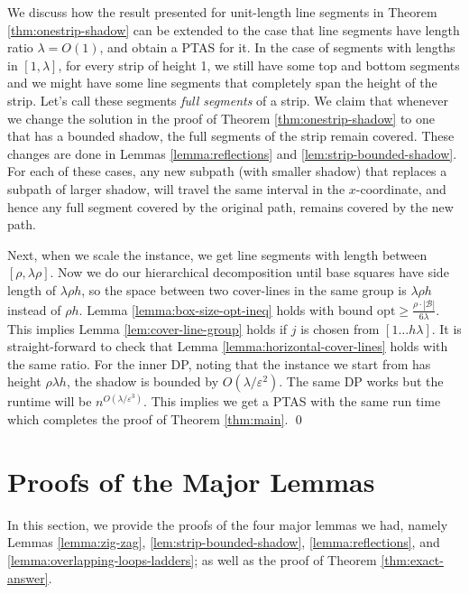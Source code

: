 \documentclass[10pt,a4paper]{amsart}
\theoremstyle{thmstyleone}
\newcommand{\eps}{\varepsilon}
\newcommand{\opt}{{\text{opt}}}
\begin{document}
	We discuss how the result presented for unit-length line segments in Theorem \ref{thm:onestrip-shadow} can be extended to the case that line segments have
	length ratio $\lambda=O(1)$, and obtain a PTAS for it.
	In the case of segments with lengths in $ [1, \lambda] $, for every strip of height 1, we still have some top and bottom segments and we might have some line segments
	that completely span the height of the strip. Let's call these segments {\em full segments} of a strip.
	We claim that whenever we change the solution in the proof of Theorem \ref{thm:onestrip-shadow} to one that has a bounded shadow, the full segments of the strip remain covered. These changes are done in Lemmas \ref{lemma:reflections} and \ref{lem:strip-bounded-shadow}. For each of these cases, any new subpath (with smaller shadow) that replaces a subpath of larger shadow, will travel the same interval in the $x$-coordinate, and hence any full segment covered by the original path, remains covered by the new path.
	
	Next, when we scale the instance, we get line segments with length between $[\rho,\lambda\rho]$.
	Now we do our hierarchical decomposition until base squares have side length of $\lambda\rho h$, so the space between
	two cover-lines in the same group is $\lambda \rho h$ instead of $\rho h$. 
	Lemma \ref{lemma:box-size-opt-ineq} holds with  bound $\opt\geq\frac{\rho\cdot|\mathcal B|}{6\lambda}$.
	This implies Lemma \ref{lem:cover-line-group} holds if $j$ is chosen from $[1\dots h\lambda]$.
	It is straight-forward to check that Lemma \ref{lemma:horizontal-cover-lines} holds with the same ratio.
	For the inner DP, noting that the instance we start from has height $\rho\lambda h$, the shadow is bounded
	by $O(\lambda/\eps^2)$. The same DP works but the runtime will be $n^{O(\lambda/\eps^3)}$. This implies
	we get a PTAS with the same run time which completes the proof of Theorem \ref{thm:main}. \qed

\section{Proofs of the Major Lemmas}
\label{sec:proofs}

In this section, we provide the proofs of the four major lemmas we had, namely Lemmas \ref{lemma:zig-zag}, \ref{lem:strip-bounded-shadow}, \ref{lemma:reflections}, and \ref{lemma:overlapping-loops-ladders}; as well
as the proof of Theorem \ref{thm:exact-answer}.
\end{document}
